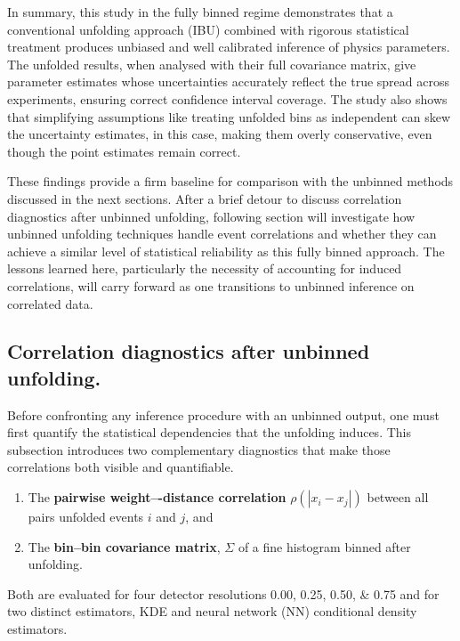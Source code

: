         In summary, this study in the fully binned regime demonstrates that a conventional unfolding approach (IBU) combined with rigorous statistical treatment produces unbiased and well calibrated inference of physics parameters.
        The unfolded results, when analysed with their full covariance matrix, give parameter estimates whose uncertainties accurately reflect the true spread across experiments, ensuring correct confidence interval coverage.
        The study also shows that simplifying assumptions like treating unfolded bins as independent can skew the uncertainty estimates, in this case, making them overly conservative, even though the point estimates remain correct.
        
        These findings provide a firm baseline for comparison with the unbinned methods discussed in the next sections.
        After a brief detour to discuss correlation diagnostics after unbinned unfolding, following section will investigate how unbinned unfolding techniques handle event correlations and whether they can achieve a similar level of statistical reliability as this fully binned approach.
        The lessons learned here, particularly the necessity of accounting for induced correlations, will carry forward as one transitions to unbinned inference on correlated data.
        
    \subsection{Correlation diagnostics after unbinned unfolding.}
    \label{subsec:weight_correlations}
        Before confronting any inference procedure with an unbinned output, one must first quantify the statistical dependencies that the unfolding induces.
        This subsection introduces two complementary diagnostics that make those correlations both visible and quantifiable.
        \begin{enumerate}
            \item The \textbf{pairwise weight–-distance correlation} $\rho(|x_i-x_j|)$ between all pairs unfolded events $i$ and $j$, and
            \item The \textbf{bin--bin covariance matrix}, \(\Sigma\) of a fine histogram binned {after} unfolding.
        \end{enumerate}
        
        Both are evaluated for four detector resolutions \numlist{0.00;0.25;0.50;0.75} and for two distinct estimators, KDE and neural network (NN) conditional density estimators.

